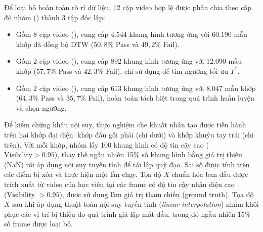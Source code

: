 \documentclass[10pt,conference,a4paper]{IEEEtran}
\begin{document}
Để loại bỏ hoàn toàn rò rỉ dữ liệu, 12 cặp video hợp lệ được phân chia theo cấp độ nhóm () thành 3 tập độc lập:
\begin{itemize}
    \item {} Gồm 8 cặp video (\text{[1, 2, 4, 8, 10, 11, 12, 15]}), cung cấp $4.544$ khung hình tương ứng với $60.190$ mẫu khớp đã đồng bộ DTW ($50{,}8\%$ Pass và $49{,}2\%$ Fail).
    \item {} Gồm 2 cặp video (\text{[3, 7]}), cung cấp $892$ khung hình tương ứng với $12.090$ mẫu khớp ($57{,}7\%$ Pass và $42{,}3\%$ Fail), chỉ sử dụng để tìm ngưỡng tối ưu $T^*$.
    \item {} Gồm 2 cặp video (\text{[5, 9]}), cung cấp $613$ khung hình tương ứng với $8.047$ mẫu khớp ($64{,}3\%$ Pass và $35{,}7\%$ Fail), hoàn toàn tách biệt trong quá trình huấn luyện và chọn ngưỡng.
\end{itemize}

Để kiểm chứng khâu nội suy, thực nghiệm che khuất nhân tạo được tiến hành trên hai khớp đại diện: khớp đầu gối phải (chi dưới) và khớp khuỷu tay trái (chi trên). Với mỗi khớp, nhóm lấy 100 khung hình có độ tin cậy cao ($\text{Visibility} > 0.95$), thay thế ngẫu nhiên 15\% số khung hình bằng giá trị thiếu (NaN) rồi áp dụng nội suy tuyến tính để tái lập quỹ đạo. Sai số được tính trên các điểm bị xóa và thực hiện một lần chạy. 
 Tọa độ $X$ chuẩn hóa ban đầu được trích xuất từ video của học viên tại các frame có độ tin cậy nhận diện cao (Visibility $> 0.95$), được sử dụng làm giá trị tham chiếu (ground truth).
 Tọa độ $X$ sau khi áp dụng thuật toán nội suy tuyến tính (\textit{linear interpolation}) nhằm khôi phục các vị trí bị thiếu do quá trình giả lập mất dấu, trong đó ngẫu nhiên $15\%$ số frame được loại bỏ.
\end{document}
